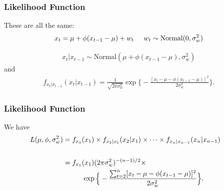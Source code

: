 \documentclass[%
xcolor=pdftex]{beamer}
\begin{document}
\begin{frame}
\frametitle{Likelihood Function}

These are all the same:
$$
x_t =\mu+\phi(x_{t-1}-\mu) + w_t \hspace{5mm} w_t \sim \text{Normal}(0, \sigma^2_w)
$$

\begin{eqnarray*}
x_t|x_{t-1}  \sim \text{Normal}(\mu+\phi(x_{t-1}-\mu),\sigma^2_w)
\end{eqnarray*}
and
\begin{eqnarray*}
 f_{x_t|x_{t-1}}(x_t|x_{t-1}) = \frac{1}{\sqrt{2\pi \sigma_w^2}}
\exp \Big \{-\frac{[x_t-\mu-\phi(x_{t-1}-\mu)]^2}{2\sigma^2 _w} \Big \}.
\end{eqnarray*}


\end{frame}

%
%

\begin{frame}
\frametitle{Likelihood Function}

We have
\begin{align*}\label{eq:cle}
L(\mu,\phi,\sigma^2_w) &= f_{x_1}(x_1) \times f_{x_2|x_1}(x_2|x_1) \times \cdots \times f_{x_n|x_{n-1}}(x_n|x_{n-1}) \cr \\
&= f_{x_1}(x_1) (2\pi \sigma^2_w)^{-(n-1)/2} \times \\
&\hspace{10mm}\exp \Big \{ -\frac{ \sum^n_{t=2} [x_t-\mu-\phi(x_{t-1}-\mu)]^2 }{2\sigma^2_w} \Big \}.
\end{align*}

\end{frame}
\end{document}
